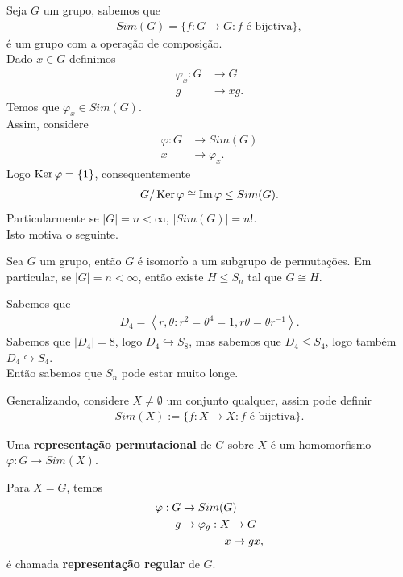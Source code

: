 Seja $G$ um grupo, sabemos que
\begin{align*}
  Sim(G)=\{f:G\to G:f \text{ é bijetiva}\},
\end{align*}
é um grupo com a operação de composição.\\
Dado $x\in G$ definimos
\begin{align*}
  \varphi_x:G&\to G\\
  g&\to xg.
\end{align*}
Temos que $\varphi_x\in Sim(G)$.\\
Assim, considere
\begin{align*}
  \varphi:G&\to Sim(G)\\
  x&\to \varphi_x.
\end{align*}
Logo $\operatorname{Ker}\varphi=\{1\}$, consequentemente
\begin{align*}
  G/\operatorname{Ker}\varphi\cong \operatorname{Im}\varphi\leq Sim(G).
\end{align*}
Particularmente se $|G|=n<\infty$, $|Sim(G)|=n!$.\\
Isto motiva o seguinte.
\begin{theorem}
  Sea $G$ um grupo, então $G$ é isomorfo a um subgrupo de permutações. Em particular, se $|G|=n<\infty$, então existe $H\leq S_n$ tal que $G\cong H$.
\end{theorem}
\begin{example}[$D_4$]
  Sabemos que
  \begin{align*}
    D_4=\left\langle r,\theta: r^{2}=\theta^{4}=1, r\theta=\theta r^{-1} \right\rangle.
  \end{align*}
  Sabemos que $|D_4|=8$, logo $D_4\hookrightarrow S_8$, mas sabemos que $D_4\leq S_4$, logo também $D_4\hookrightarrow S_4$.\\
  Então sabemos que $S_n$ pode estar muito longe. 
\end{example}
Generalizando, considere $X\neq \emptyset$ um conjunto qualquer, assim pode definir
\begin{align*}
  Sim(X):=\{f:X\to X:f\text{ é bijetiva}\}.
\end{align*}
\begin{definition}
  Uma \textbf{representação permutacional} de $G$ sobre $X$ é um homomorfismo $\varphi:G\to Sim(X)$. 
\end{definition}
\begin{example}
  Para $X=G$, temos
  \begin{align*}
    \varphi: G&\to Sim(G)\\
    g&\to \varphi_g:X\to G\\
    \phantom{g}&\phantom{\to \varphi_g:}\hspace{0.34cm}x\to gx,
  \end{align*}
  é chamada \textbf{representação regular} de $G$.
\end{example}
